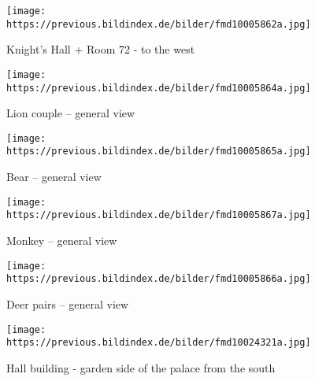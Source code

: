 \documentclass[
  a4paper,
]{book}
\begin{document}
\tableofcontents
{\let\newpage\relax}

\mainmatter
\begin{figure*}

\begin{figure}[H]    
  \texttt{[image: https://previous.bildindex.de/bilder/fmd10005862a.jpg]}
  \caption{Knight's Hall + Room 72 - to the west}
  \label{fig:{https://previous.bildindex.de/bilder/fmd10005862a.jpg}}
\end{figure}

\clearpage

\begin{figure}[H]    
  \texttt{[image: https://previous.bildindex.de/bilder/fmd10005864a.jpg]}
  \caption{Lion couple – general view}
  \label{fig:{https://previous.bildindex.de/bilder/fmd10005864a.jpg}}
\end{figure}

\clearpage

\begin{figure}[H]    
  \texttt{[image: https://previous.bildindex.de/bilder/fmd10005865a.jpg]}
  \caption{Bear – general view}
  \label{fig:{https://previous.bildindex.de/bilder/fmd10005865a.jpg}}
\end{figure}

\clearpage

\begin{figure}[H]    
  \texttt{[image: https://previous.bildindex.de/bilder/fmd10005867a.jpg]}
  \caption{Monkey – general view}
  \label{fig:{https://previous.bildindex.de/bilder/fmd10005867a.jpg}}
\end{figure}

\clearpage

\begin{figure}[H]    
  \texttt{[image: https://previous.bildindex.de/bilder/fmd10005866a.jpg]}
  \caption{Deer pairs – general view}
  \label{fig:{https://previous.bildindex.de/bilder/fmd10005866a.jpg}}
\end{figure}

\clearpage

\begin{figure}[H]    
  \texttt{[image: https://previous.bildindex.de/bilder/fmd10024321a.jpg]}
  \caption{Hall building - garden side of the palace from the south}
  \label{fig:{https://previous.bildindex.de/bilder/fmd10024321a.jpg}}
\end{figure}

\clearpage


\end{figure*}
\end{document}
